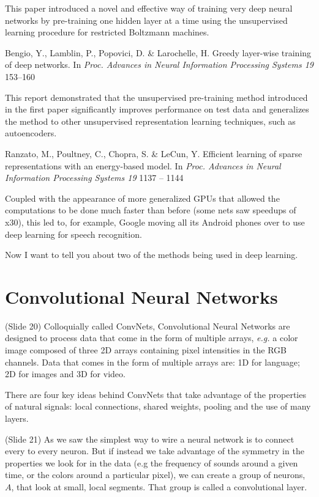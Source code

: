 \documentclass[twocolumn]{article}
\begin{document}
This paper introduced a novel and effective way of training very deep neural
networks by pre-training one hidden layer at a time using the unsupervised
learning procedure for restricted Boltzmann machines.

Bengio, Y., Lamblin, P., Popovici, D. \& Larochelle, H. Greedy layer-wise
training of deep networks. In \textit{Proc. Advances in Neural Information
Processing Systems 19} 153–160

This report demonstrated that the unsupervised pre-training method
introduced in the first paper significantly improves performance on test data
and generalizes the method to other unsupervised representation learning
techniques, such as autoencoders.

Ranzato, M., Poultney, C., Chopra, S. \& LeCun, Y. Efficient learning of sparse
representations with an energy-based model. In \textit{Proc. Advances in Neural
Information Processing Systems 19} 1137 – 1144

Coupled with the appearance of more generalized GPUs that allowed the
computations to be done much faster than before (some nets saw speedups of x30),
this led to, for example, Google moving all its Android phones over to use deep
learning for speech recognition.

Now I want to tell you about two of the methods being used in deep learning.

\section{Convolutional Neural Networks}
(Slide 20) Colloquially called ConvNets, Convolutional Neural Networks are
designed to process data that come in the form of multiple arrays, \textit{e.g.}
a color image composed of three 2D arrays containing pixel intensities in the
RGB channels. Data that comes in the form of multiple arrays are: 1D for
language; 2D for images and 3D for video.

There are four key ideas behind ConvNets that take advantage of the properties
of natural signals: local connections, shared weights, pooling and the use of
many layers.

(Slide 21) As we saw the simplest way to wire a neural network is to connect
every to every neuron. But if instead we take advantage of the symmetry in the
properties we look for in the data (e.g the frequency of sounds around a given
time, or the colors around a particular pixel), we can create a group of
neurons, \(A\), that look at small, local segments. That group is called a
convolutional layer.
\end{document}
